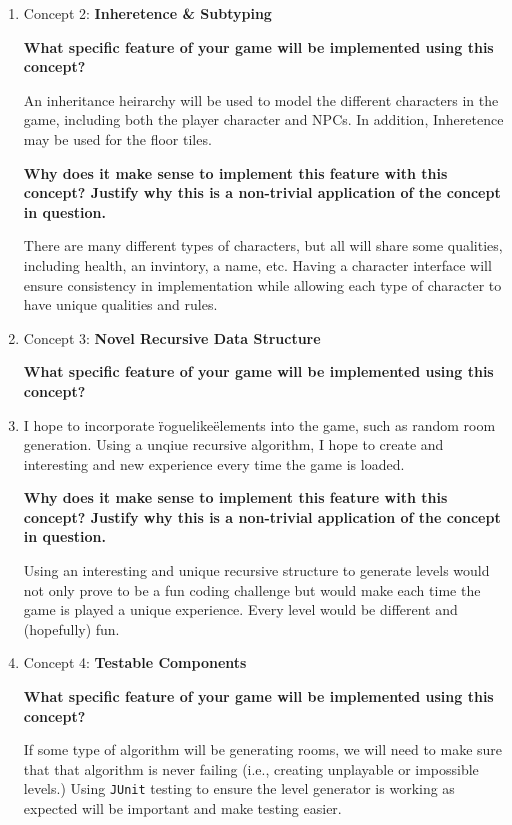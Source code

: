 \documentclass[12pt]{article}
\begin{document}
\begin{enumerate}[leftmargin=\labelsep]
    \bigskip
    
    \item Concept 2: \textbf{Inheretence \& Subtyping}
    
    \textbf{What specific feature of your game will be implemented using this
     concept?}
    
    An inheritance heirarchy will be used to model the different characters in 
    the game, including both the player character and NPCs. In addition, 
    Inheretence may be used for the floor tiles.
    
    
    \textbf{Why does it make sense to implement this feature with this concept?
     Justify why this is a non-trivial application of the concept in question.}


    There are many different types of characters, but all will share some 
    qualities, including health, an invintory, a name, etc. Having a character 
    interface will ensure consistency in implementation while allowing each type
    of character to have unique qualities and rules.

    \item Concept 3: \textbf{Novel Recursive Data Structure} 
    
    \textbf{What specific feature of your game will be implemented using this
     concept?}
    
    \item 
    I hope to incorporate \"roguelike\" elements into the game, such as random 
    room generation. Using a unqiue recursive algorithm, I hope to create and
    interesting and new experience every time the game is loaded. 
    

    \textbf{Why does it make sense to implement this feature with this concept?
      Justify why this is a non-trivial application of the concept in question.
    }


    Using an interesting and unique recursive structure to generate levels would
    not only prove to be a fun coding challenge but would make each time the
    game is played a unique experience. Every level would be different and
    (hopefully) fun.

    \item Concept 4: \textbf{Testable Components}
    
    
    \textbf{What specific feature of your game will be implemented using this concept?
    }
    
    
    If some type of algorithm will be generating rooms, we will need to make
    sure that that algorithm is never failing (i.e., creating unplayable or
    impossible levels.) Using \texttt{JUnit} testing to ensure the level
    generator is working as expected will be important and make testing
    easier.



\end{enumerate}
\end{document}
